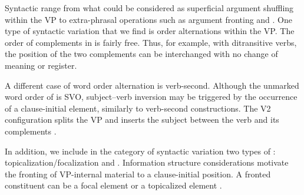 \documentclass[output=paper]{langsci/langscibook}
\begin{document}
Syntactic  range from what could be considered as superficial argument shuffling within the VP to extra-phrasal operations such as argument fronting and . One type of syntactic variation that we find is order alternations within the VP. The order of complements in  is fairly free. Thus, for example, with ditransitive verbs, the position of the two complements can be interchanged with no change of meaning or register.

\eal
\zl

A different case of word order alternation is verb-second. Although the unmarked word order of  is SVO, subject--verb inversion may be triggered by the occurrence of a clause-initial element, similarly to verb-second constructions. The V2 configuration splits the VP and inserts the subject between the verb and its complements .

\eal
\zl

In addition, we include in the category of syntactic variation two types of : topicalization\slash focalization and . Information structure considerations motivate the fronting of VP-internal material to a clause-initial position. A fronted constituent can be a focal element  or a topicalized element .

\eal
\zl
\end{document}
